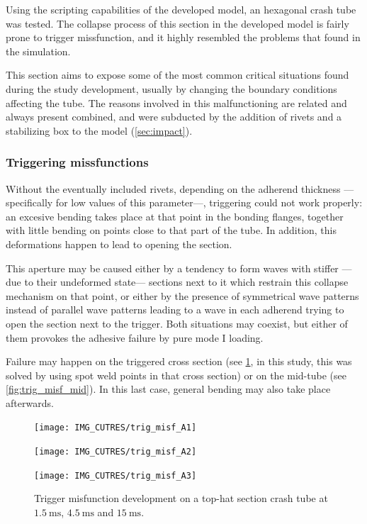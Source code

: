 \documentclass[cmfonts]{witpress}
\begin{document}
Using the scripting capabilities of the developed model, an hexagonal crash tube was tested. The collapse process of this section in the developed model is fairly prone to trigger missfunction, and it highly resembled the problems that \cite{Yang2012} found in the simulation.


This section aims to expose some of the most common critical situations found during the study development, usually by changing the boundary conditions affecting the tube. The reasons involved in this malfunctioning are related and always present combined, and were subducted by the addition of rivets and a stabilizing box to the model (\cref{sec:impact}).

\subsubsection{Triggering missfunctions}  %
\label{sec:trig_missf}

Without the eventually included rivets, depending on the adherend thickness ---specifically for low values of this parameter---, triggering could not work properly: an excesive bending takes place at that point in the bonding flanges, together with little bending on points close to that part of the tube. In addition, this deformations happen to lead to opening the section.

This aperture may be caused either by a tendency to form waves with stiffer ---due to their undeformed state--- sections next to it which restrain this collapse mechanism on that point, or either by the presence of symmetrical wave patterns instead of parallel wave patterns leading to a wave in each adherend trying to open the section next to the trigger. Both situations may coexist, but either of them provokes the adhesive failure by pure mode I loading.

Failure may happen on the triggered cross section (see \cref{fig:trig_misf_A}, in this study, this was solved by using spot weld points in that cross section) or on the mid-tube (see \cref{fig:trig_misf_mid}). In this last case, general bending may also take place afterwards.

\begin{figure}
	\centering
	\begin{minipage}[b]{.65\linewidth}
		\texttt{[image: IMG\_CUTRES/trig\_misf\_A1]}
	\end{minipage}
	\quad
	\begin{minipage}[b]{.65\linewidth}
		\texttt{[image: IMG\_CUTRES/trig\_misf\_A2]}
	\end{minipage}
	\quad
	\begin{minipage}[b]{.65\linewidth}
		\texttt{[image: IMG\_CUTRES/trig\_misf\_A3]}
	\end{minipage}
	\caption{Trigger misfunction development on a top-hat section crash tube at $\SI{1.5}{\ms}$, $\SI{4.5}{\ms}$ and $\SI{15}{\ms}$.}
	\label{fig:trig_misf_A}
\end{figure}
\end{document}
